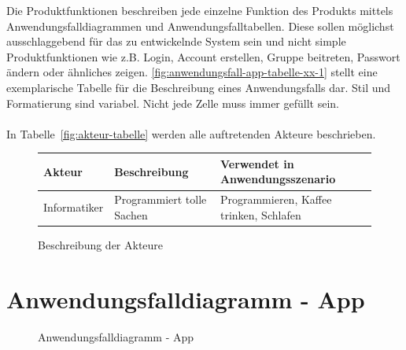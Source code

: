 \begin{tcolorbox}
Die Produktfunktionen beschreiben jede einzelne Funktion des Produkts mittels Anwendungsfalldiagrammen und Anwendungsfalltabellen.
Diese sollen möglichst ausschlaggebend für das zu entwickelnde System sein und nicht simple Produktfunktionen wie z.B. Login, Account erstellen, Gruppe beitreten, Passwort ändern oder ähnliches zeigen.
\autoref{fig:anwendungsfall-app-tabelle-xx-1} stellt eine exemplarische Tabelle für die Beschreibung eines Anwendungsfalls dar. Stil und Formatierung sind variabel. Nicht jede Zelle muss immer gefüllt sein.
\\\\
In  Tabelle~\autoref{fig:akteur-tabelle} werden alle auftretenden Akteure beschrieben.


\end{tcolorbox}

\begin{figure}[h]
	\centering
	
	\begin{tabularx}{\textwidth}{ p{} | p{} | X }
		\textbf{Akteur} & \textbf{Beschreibung} & \textbf{Verwendet in Anwendungsszenario} \\ \hline
		Informatiker & Programmiert tolle Sachen & Programmieren, Kaffee trinken, Schlafen
	\end{tabularx}
	
	\caption{Beschreibung der Akteure}
	\label{fig:akteur-tabelle}
\end{figure}



\section{Anwendungsfalldiagramm - App}

\begin{figure}[h]
	\centering
	\caption{Anwendungsfalldiagramm - App}
	\label{fig:anwendungsfalldiagramm-app}
\end{figure}

\newpage

